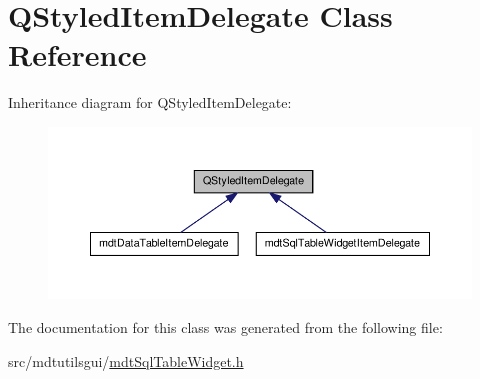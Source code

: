 \hypertarget{class_q_styled_item_delegate}{\section{Q\-Styled\-Item\-Delegate Class Reference}
\label{class_q_styled_item_delegate}
}


Inheritance diagram for Q\-Styled\-Item\-Delegate\-:\nopagebreak
\begin{figure}[H]
\begin{center}
\leavevmode
\includegraphics[width=350pt]{class_q_styled_item_delegate__inherit__graph}
\end{center}
\end{figure}


The documentation for this class was generated from the following file\-:\begin{DoxyCompactItemize}
\item 
src/mdtutilsgui/\hyperlink{mdt_sql_table_widget_8h}{mdt\-Sql\-Table\-Widget.\-h}\end{DoxyCompactItemize}
